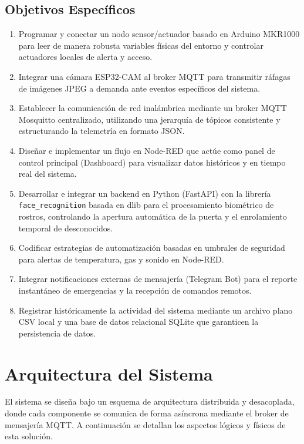 \documentclass[12pt,letterpaper]{article}
\begin{document}
\subsection{Objetivos Específicos}
\begin{enumerate}
    \item Programar y conectar un nodo sensor/actuador basado en Arduino MKR1000 para leer de manera robusta variables físicas del entorno y controlar actuadores locales de alerta y acceso.
    \item Integrar una cámara ESP32-CAM al broker MQTT para transmitir ráfagas de imágenes JPEG a demanda ante eventos específicos del sistema.
    \item Establecer la comunicación de red inalámbrica mediante un broker MQTT Mosquitto centralizado, utilizando una jerarquía de tópicos consistente y estructurando la telemetría en formato JSON.
    \item Diseñar e implementar un flujo en Node-RED que actúe como panel de control principal (Dashboard) para visualizar datos históricos y en tiempo real del sistema.
    \item Desarrollar e integrar un backend en Python (FastAPI) con la librería \texttt{face\_recognition} basada en dlib para el procesamiento biométrico de rostros, controlando la apertura automática de la puerta y el enrolamiento temporal de desconocidos.
    \item Codificar estrategias de automatización basadas en umbrales de seguridad para alertas de temperatura, gas y sonido en Node-RED.
    \item Integrar notificaciones externas de mensajería (Telegram Bot) para el reporte instantáneo de emergencias y la recepción de comandos remotos.
    \item Registrar históricamente la actividad del sistema mediante un archivo plano CSV local y una base de datos relacional SQLite que garanticen la persistencia de datos.
\end{enumerate}
\newpage

\section{Arquitectura del Sistema}
El sistema se diseña bajo un esquema de arquitectura distribuida y desacoplada, donde cada componente se comunica de forma asíncrona mediante el broker de mensajería MQTT. A continuación se detallan los aspectos lógicos y físicos de esta solución.
\end{document}

